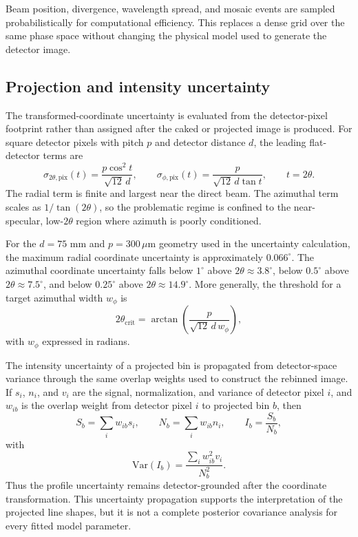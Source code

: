Beam position, divergence, wavelength spread, and mosaic events are sampled probabilistically for computational efficiency. This replaces a dense grid over the same phase space without changing the physical model used to generate the detector image.


\subsection{Projection and intensity uncertainty}

The transformed-coordinate uncertainty is evaluated from the detector-pixel footprint rather than assigned after the caked or projected image is produced. For square detector pixels with pitch $p$ and detector distance $d$, the leading flat-detector terms are
\begin{equation}
\sigma_{2\theta,\mathrm{pix}}(t)=\frac{p\cos^{2}t}{\sqrt{12}\,d},
\qquad
\sigma_{\phi,\mathrm{pix}}(t)=\frac{p}{\sqrt{12}\,d\tan t},
\qquad t=2\theta .
\end{equation}
The radial term is finite and largest near the direct beam. The azimuthal term scales as $1/\tan(2\theta)$, so the problematic regime is confined to the near-specular, low-$2\theta$ region where azimuth is poorly conditioned.

For the $d=75$ mm and $p=300\,\mu\mathrm{m}$ geometry used in the uncertainty calculation, the maximum radial coordinate uncertainty is approximately $0.066^{\circ}$. The azimuthal coordinate uncertainty falls below $1^{\circ}$ above $2\theta\approx3.8^{\circ}$, below $0.5^{\circ}$ above $2\theta\approx7.5^{\circ}$, and below $0.25^{\circ}$ above $2\theta\approx14.9^{\circ}$. More generally, the threshold for a target azimuthal width $w_{\phi}$ is
\begin{equation}
2\theta_{\mathrm{crit}}=\arctan\!\left(\frac{p}{\sqrt{12}\,d\,w_{\phi}}\right),
\end{equation}
with $w_{\phi}$ expressed in radians.

The intensity uncertainty of a projected bin is propagated from detector-space variance through the same overlap weights used to construct the rebinned image. If $s_i$, $n_i$, and $v_i$ are the signal, normalization, and variance of detector pixel $i$, and $w_{ib}$ is the overlap weight from detector pixel $i$ to projected bin $b$, then
\begin{equation}
S_b=\sum_i w_{ib}s_i,
\qquad
N_b=\sum_i w_{ib}n_i,
\qquad
I_b=\frac{S_b}{N_b},
\end{equation}
with
\begin{equation}
\mathrm{Var}(I_b)=\frac{\sum_i w_{ib}^{2}v_i}{N_b^{2}}.
\end{equation}
Thus the profile uncertainty remains detector-grounded after the coordinate transformation. This uncertainty propagation supports the interpretation of the projected line shapes, but it is not a complete posterior covariance analysis for every fitted model parameter.
